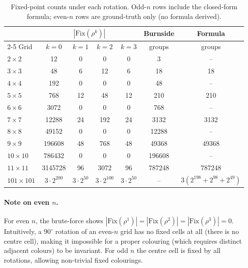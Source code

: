 \documentclass{article}
\newcommand{\Fix}{\mathrm{Fix}}
\begin{document}
\begin{table}[h]
  \centering
  \caption{Fixed-point counts under each rotation.
    Odd-$n$ rows include the closed-form formula; even-$n$
    rows are ground-truth only (no formula derived).}
  \label{tab:fix}
  \begin{tabular}{lcccccc}
    \toprule
    & \multicolumn{4}{c}{$|\Fix(\rho^k)|$} &
    Burnside &
    Formula \\
    \cmidrule(lr){2-5}
    Grid & $k=0$ & $k=1$ & $k=2$ & $k=3$
         & groups & groups \\
    \midrule
    $2\times 2$   & 12     & 0       & 0       & 0      & 3       & -- \\
    $3\times 3$   & 48     & 6       & 12      & 6      & 18      & 18 \\
    $4\times 4$   & 192    & 0       & 0       & 0      & 48      & -- \\
    $5\times 5$   & 768    & 12      & 48      & 12     & 210     & 210 \\
    $6\times 6$   & 3072   & 0       & 0       & 0      & 768     & -- \\
    $7\times 7$   & 12288  & 24      & 192     & 24     & 3132    & 3132 \\
    $8\times 8$   & 49152  & 0       & 0       & 0      & 12288   & -- \\
    $9\times 9$   & 196608 & 48      & 768     & 48     & 49368   & 49368 \\
    $10\times 10$ & 786432 & 0       & 0       & 0      & 196608  & -- \\
    $11\times 11$ & 3145728& 96      & 3072    & 96     & 787248  & 787248 \\
    \midrule
    $101\times 101$
      & $3\cdot 2^{200}$ & $3\cdot 2^{50}$
      & $3\cdot 2^{100}$ & $3\cdot 2^{50}$
      & -- & $3(2^{198}+2^{98}+2^{49})$ \\
    \bottomrule
  \end{tabular}
\end{table}

\paragraph{Note on even $n$.}
For even $n$, the brute-force shows
$|\Fix(\rho^1)| = |\Fix(\rho^2)| = |\Fix(\rho^3)| = 0$.
Intuitively, a $90^\circ$ rotation of an even-$n$ grid
has no fixed cells at all (there is no centre cell), making
it impossible for a proper colouring (which requires distinct
adjacent colours) to be invariant.  For odd $n$ the centre
cell is fixed by all rotations, allowing non-trivial fixed
colourings.
\end{document}
